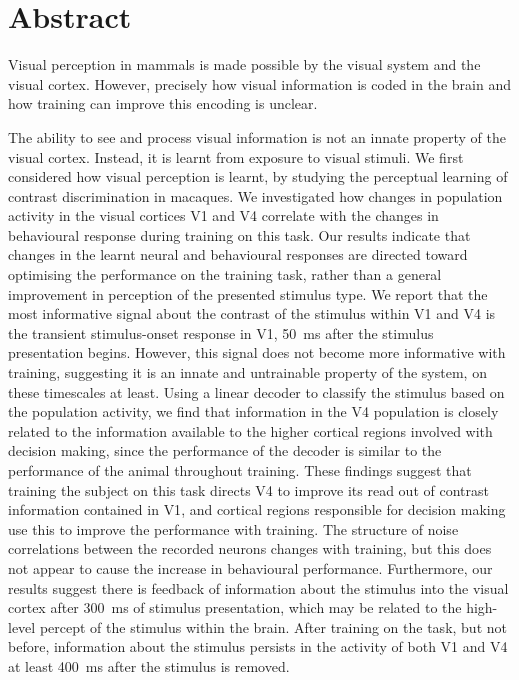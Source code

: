 \begingroup
\let\clearpage\relax
\let\cleardoublepage\relax
\let\cleardoublepage\relax

\chapter*{Abstract}

Visual perception in mammals is made possible by the visual system and the visual cortex.
However, precisely how visual information is coded in the brain and how training can improve this encoding is unclear.

The ability to see and process visual information is not an innate property of the visual cortex.
Instead, it is learnt from exposure to visual stimuli.
We first considered how visual perception is learnt, by studying the perceptual learning of contrast discrimination in macaques.
We investigated how changes in population activity in the visual cortices \acs{V1} and \acs{V4} correlate with the changes in behavioural response during training on this task.
Our results indicate that changes in the learnt neural and behavioural responses are directed toward optimising the performance on the training task, rather than a general improvement in perception of the presented stimulus type.
We report that the most informative signal about the contrast of the stimulus within \acs{V1} and \acs{V4} is the transient stimulus-onset response in \acs{V1}, \SI{50}{\milli\second} after the stimulus presentation begins.
However, this signal does not become more informative with training, suggesting it is an innate and untrainable property of the system, on these timescales at least.
Using a linear decoder to classify the stimulus based on the population activity, we find that information in the \acs{V4} population is closely related to the information available to the higher cortical regions involved with decision making, since the performance of the decoder is similar to the performance of the animal throughout training.
These findings suggest that training the subject on this task directs \acs{V4} to improve its read out of contrast information contained in \acs{V1}, and cortical regions responsible for decision making use this to improve the performance with training.
The structure of noise correlations between the recorded neurons changes with training, but this does not appear to cause the increase in behavioural performance.
Furthermore, our results suggest there is feedback of information about the stimulus into the visual cortex after \SI{300}{\milli\second} of stimulus presentation, which may be related to the high-level percept of the stimulus within the brain.
After training on the task, but not before, information about the stimulus persists in the activity of both \acs{V1} and \acs{V4} at least \SI{400}{\milli\second} after the stimulus is removed.

